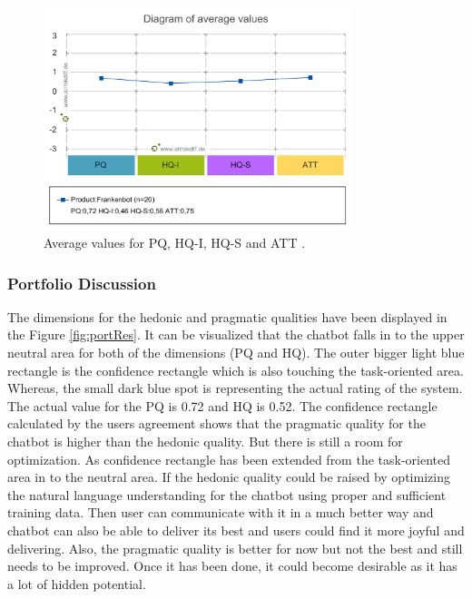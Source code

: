 \begin{figure}[!h]
    \centering
    \includegraphics[width=0.8\textwidth]{img/Diagram_of_average_values.png}
    \caption{Average values for PQ, HQ-I, HQ-S and ATT \cite{attrakdiff}.}
    \label{fig:avgValAttrak}
\end{figure}

\subsubsection*{Portfolio Discussion}
The dimensions for the hedonic and pragmatic qualities have been displayed in the Figure \ref{fig:portRes}. It can be visualized that the chatbot falls in to the upper neutral area for both of the dimensions (PQ and HQ). The outer bigger light blue rectangle is the confidence rectangle which is also touching the task-oriented area. Whereas, the small dark blue spot is representing the actual rating of the system. The actual value for the PQ is 0.72 and HQ is 0.52. The confidence rectangle calculated by the users agreement shows that the pragmatic quality for the chatbot is higher than the hedonic quality. But there is still a room for optimization. As confidence rectangle has been extended from the task-oriented area in to the neutral area. If the hedonic quality could be raised by optimizing the natural language understanding for the chatbot using proper and sufficient training data. Then user can communicate with it in a much better way and chatbot can also be able to deliver its best and users could find it more joyful and delivering. Also, the pragmatic quality is better for now but not the best and still needs to be improved. Once it has been done, it could become desirable as it has a lot of hidden potential. 

